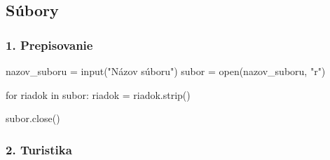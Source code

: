 \subsection{Súbory}

\subsubsection*{1. Prepisovanie}

\begin{solution}
nazov_suboru = input("Názov súboru")
subor = open(nazov_suboru, "r")

for riadok in subor:
    riadok = riadok.strip()

subor.close()
\end{solution}

\subsubsection*{2. Turistika}

